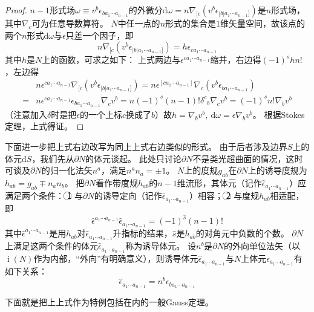 \begin{proof}
    $n - 1$形式场$\omega \equiv v^b\epsilon_{b a_1 \cdots a_{n - 1}}$的外微分$\mathrm{d}\omega = n\nabla_{[c}(v^b\epsilon_{|b|a_1 \cdots a_{n - 1}]})$是$n$形式场，其中$\nabla_c$可为任意导数算符。
    $N$中任一点的$n$形式的集合是$1$维矢量空间，故该点的两个$n$形式$\mathrm{d}\omega$与$\epsilon$只差一个因子，即
    $$n\nabla_{[c}(v^b\epsilon_{|b|a_1 \cdots a_{n - 1}]}) = h\epsilon_{ca_1 \cdots a_{n - 1}}$$
    其中$h$是$N$上的函数，可求之如下：
    上式两边与$\epsilon^{ca_1 \cdots a_{n - 1}}$缩并，右边得$(-1)^shn!$，左边得
    \[\begin{split}
        & n\epsilon^{ca_1 \cdots a_{n - 1}}\nabla_{[c}(v^b\epsilon_{|b|a_1 \cdots a_{n - 1}]}) = n\epsilon^{[ca_1 \cdots a_{n - 1}]}\nabla_{c}(v^b\epsilon_{ba_1 \cdots a_{n - 1}}) \\
        = & n\epsilon^{ca_1 \cdots a_{n - 1}}\epsilon_{ba_1 \cdots a_{n - 1}}\nabla_{c}v^b = n(-1)^s(n - 1)!\delta^c{}_b\nabla_cv^b = (-1)^sn!\nabla_bv^b
    \end{split}\]
    （注意加入$\delta$时是把$\epsilon$的一个上标$c$换成了$b$）故$h = \nabla_bv^b, ~ \mathrm{d}\omega = \epsilon\nabla_bv^b$。
    根据Stokes定理，上式得证。
\end{proof}

下面进一步把上式右边改写为同上上式右边类似的形式。
由于后者涉及边界$S$上的体元$\mathrm{d}S$，我们先从$\partial N$的体元谈起。
此处只讨论$\partial N$不是类光超曲面的情况，这时可谈及$\partial N$的归一化法矢$n^a$，满足$n^an_a = \pm 1$。
$N$上的度规$g_{ab}$在$\partial N$上的诱导度规为$h_{ab} = g_{ab} \mp n_an_b$。
把$\partial N$看作带度规$h_{ab}$的$n - 1$维流形，其体元（记作$\hat\epsilon_{a_1 \cdots a_{n - 1}}$）应满足两个条件：
\textcircled{1} 与$\partial N$的诱导定向（记作$\bar\epsilon_{a_1 \cdots a_{n - 1}}$）相容；
\textcircled{2} 与度规$h_{ab}$相适配，即
$$\hat\epsilon^{a_1 \cdots a_{n - 1}}\hat\epsilon_{a_1 \cdots a_{n - 1}} = (-1)^{\hat s}(n - 1)!$$
其中$\hat\epsilon^{a_1 \cdots a_{n - 1}}$是用$h_{ab}$对$\hat\epsilon_{a_1 \cdots a_{n - 1}}$升指标的结果，$\hat s$是$h_{ab}$的对角元中负数的个数。
$\partial N$上满足这两个条件的体元$\hat\epsilon_{a_1 \cdots a_{n - 1}}$称为诱导体元。
设$n^b$是$\partial N$的外向单位法矢（以$\operatorname{i}(N)$作为内部，``外向''有明确意义），则诱导体元$\hat\epsilon_{a_1 \cdots a_{n - 1}}$与$N$上体元$\epsilon_{a_1 \cdots a_{n - 1}}$有如下关系：
$$\hat\epsilon_{a_1 \cdots a_{n - 1}} = n^b\epsilon_{b a_1 \cdots a_{n - 1}}$$

下面就是把上上式作为特例包括在内的一般Gauss定理。

